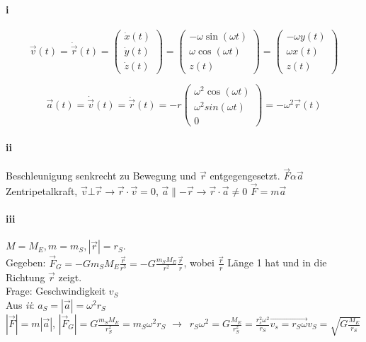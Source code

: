 \documentclass[oneside]{book}
\theoremstyle{definition}
\newcommand{\conseq}{$\rightarrow$~}
\newcommand{\dotvec}[1]{\dot{\vec{#1}}}
\newcommand{\ddotvec}[1]{\ddot{\vec{#1}}}
\begin{document}
\paragraph{i}

$$\vec{v}(t) = \dot{\vec{r}}(t) = \begin{pmatrix}\dot{x}(t)\\ \dot{y}(t)\\ \dot{z}(t)\end{pmatrix} =  \begin{pmatrix}- \omega \sin(\omega t) \\ \omega \cos(\omega t) \\ z(t)\end{pmatrix} = \begin{pmatrix}- \omega y(t) \\ \omega x(t) \\ z(t)\end{pmatrix}$$

$$\vec{a}(t) = \dotvec v (t) = \ddotvec r (t) = - r \begin{pmatrix}\omega^2 \cos(\omega t) \\ \omega^2 sin(\omega t) \\ 0 \end{pmatrix} = - \omega^2 \vec{r}(t)$$

\paragraph{ii}
Beschleunigung senkrecht zu Bewegung und $\vec{r}$ entgegengesetzt. $\vec{F} \alpha \vec{a}$ Zentripetalkraft, $\vec{v} \bot \vec{r} \rightarrow \vec{r} \cdot \vec{v} = 0$, $\vec{a} \parallel - \vec{r} \rightarrow \vec{r} \cdot \vec{a} \neq 0$ $\vec{F} = m \vec{a}$

\paragraph{iii}
$M = M_E, m = m_S, |\vec{r}| = r_S$.\\
Gegeben: $\vec{F}_G = - G m_S M_E \frac{\vec{r}}{r^3} = - G \frac{m_S M_E}{r^2} \frac{\vec{r}}{r}$, wobei $\frac{\vec{r}}{r}$ Länge 1 hat und in die Richtung $\vec{r}$ zeigt.\\
Frage: Geschwindigkeit $v_S$\\
Aus \textit{ii}: $a_S = | \vec{a}| = \omega^2 r_S$\\
$|\vec{F}| = m |\vec{a}|$, $|\vec{F}_G| = G \frac{m_S M_E}{r_S^2} = m_S \omega^2 r_S$ \conseq $r_S \omega^2 = G \frac{M_E}{r_S^2} = \frac{r_s^2 \omega^2}{r_S} \overrightarrow{v_s = r_S \omega} v_S = \sqrt{G \frac{M_E}{r_S}}$
\end{document}
